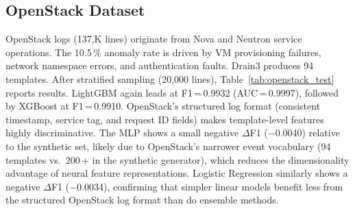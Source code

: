 \documentclass[5p, times]{elsarticle}
\begin{document}
\begin{table}[h!]
\centering
\caption{Performance results for BGL data}
\label{tab:bgl_test}
\end{table}

\subsection{OpenStack Dataset}

OpenStack logs (137{,}K lines) originate from Nova and Neutron service operations. The 10.5\,\% anomaly rate is driven by VM provisioning failures, network namespace errors, and authentication faults. Drain3 produces 94 templates. After stratified sampling
(20{,}000 lines), Table~\ref{tab:openstack_test} reports results. LightGBM again leads at F1\,=\,0.9932 (AUC\,=\,0.9997), followed by XGBoost at F1\,=\,0.9910. OpenStack's structured log format
(consistent timestamp, service tag, and request ID fields) makes template-level features highly discriminative. The MLP shows a small negative $\Delta$F1 ($-$0.0040) relative to the synthetic
set, likely due to OpenStack's narrower event vocabulary (94 templates vs.\ 200\,+ in the synthetic generator), which reduces the dimensionality advantage of neural feature representations. Logistic Regression similarly shows a negative $\Delta$F1 ($-$0.0034), confirming that simpler linear models benefit less from the structured OpenStack log format than do ensemble methods.
\end{document}
